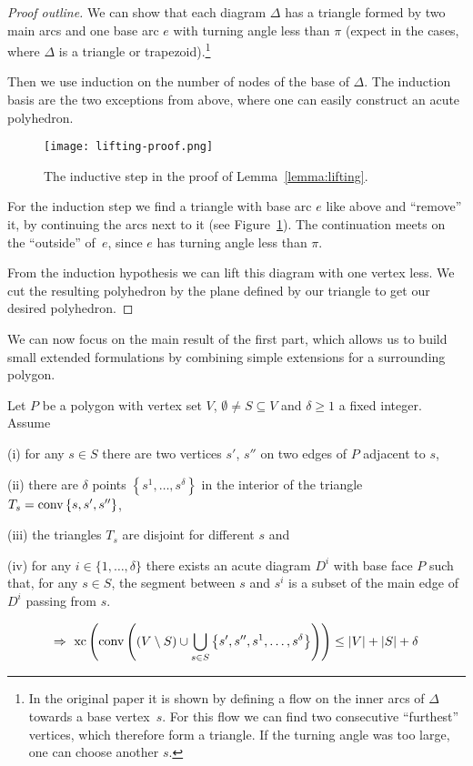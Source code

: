 \begin{proof}[Proof outline]
  We can show that each diagram $\Delta$ has a triangle formed by two main arcs and one base arc $e$ with turning angle less than $\pi$ (expect in the cases, where $\Delta$ is a triangle or trapezoid).\footnote{In the original paper it is shown by defining a flow on the inner arcs of $\Delta$ towards a base vertex~$s$. For this flow we can find two consecutive ``furthest'' vertices, which therefore form a triangle. If the turning angle was too large, one can choose another $s$.}

  Then we use induction on the number of nodes of the base of $\Delta$. The induction basis are the two exceptions from above, where one can easily construct an acute polyhedron.

  \begin{figure}[ht]
    \centering
    \texttt{[image: lifting-proof.png]}
    \caption{The inductive step in the proof of Lemma~\ref{lemma:lifting}. \cite[Figure 2]{shitov2020sublinear}}
    \label{fig:lifting-proof}
  \end{figure}

  For the induction step we find a triangle with base arc $e$ like above and ``remove'' it, by continuing the arcs next to it (see Figure~\ref{fig:lifting-proof}). The continuation meets on the ``outside'' of~$e$, since $e$ has turning angle less than $\pi$.

  From the induction hypothesis we can lift this diagram with one vertex less. We cut the resulting polyhedron by the plane defined by our triangle to get our desired polyhedron.
\end{proof}

We can now focus on the main result of the first part, which allows us to build small extended formulations by combining simple extensions for a surrounding polygon.

\begin{theorem}\label{theorem:gluing}
  Let $P$ be a polygon with vertex set $V$, $\emptyset \neq S \subseteq V$ and $\delta \geq 1$ a fixed integer. Assume

  (i) for any $s \in S$ there are two vertices $s'$, $s''$ on two edges of $P$ adjacent to $s$,

  (ii) there are $\delta$ points $\left\{s^1, \dots, s^\delta \right\}$ in the interior of the triangle ${T_s = \operatorname{conv} \left\{s,s',s''\right\}}$,

  (iii) the triangles $T_s$ are disjoint for different $s$ and

  (iv) for any $i \in \{1,\dots,\delta\}$ there exists an acute diagram $D^i$ with base face $P$ such that, for any $s \in S$, the segment between $s$ and $s^i$ is a subset of the main edge of $D^i$ passing from $s$.

  $$\Rightarrow \ \operatorname{xc}\left( \operatorname{conv}\left( (V \setminus S) \cup \bigcup_{s \in S} \left\{ s',s'',s^1,\dots,s^\delta \right\}  \right) \right) \leq \lvert V\rvert + \lvert S\rvert + \delta$$
\end{theorem}

